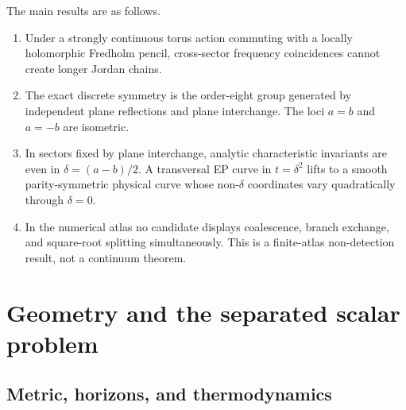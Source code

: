 \documentclass[10pt]{article}
\theoremstyle{plain}
\begin{document}
The main results are as follows.
\begin{enumerate}
\item Under a strongly continuous torus action commuting with a locally
  holomorphic Fredholm pencil, cross-sector frequency coincidences cannot
  create longer Jordan chains.
\item The exact discrete symmetry is the order-eight group generated by
  independent plane reflections and plane interchange. The loci $a=b$ and
  $a=-b$ are isometric.
\item In sectors fixed by plane interchange, analytic characteristic invariants
  are even in $\delta=(a-b)/2$. A transversal EP curve in $t=\delta^2$ lifts to
  a smooth parity-symmetric physical curve whose non-$\delta$ coordinates vary
  quadratically through $\delta=0$.
\item In the numerical atlas no candidate displays coalescence, branch
  exchange, and square-root splitting simultaneously. This is a finite-atlas
  non-detection result, not a continuum theorem.
\end{enumerate}

\section{Geometry and the separated scalar problem}

\subsection{Metric, horizons, and thermodynamics}
\end{document}
